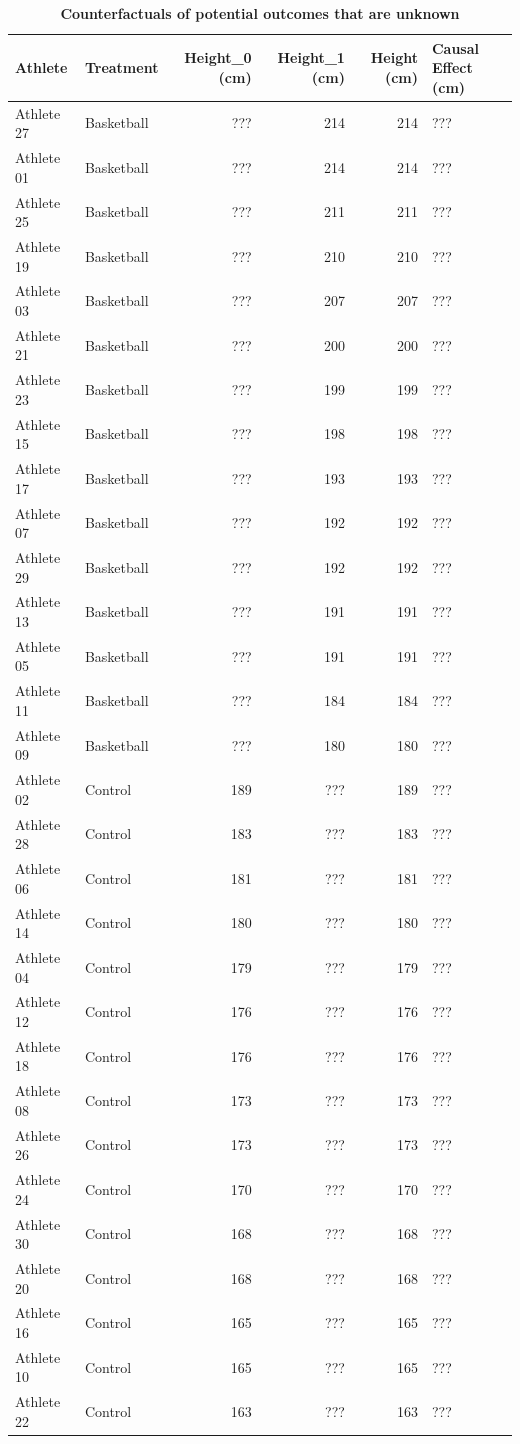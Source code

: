 \documentclass[
]{book}
\begin{document}
\begin{table}

\caption{\label{tab:basketball-counterfactuals}\textbf{Counterfactuals of potential outcomes that are unknown}}
\centering
\begin{tabular}[t]{llrrrl}
\toprule
Athlete & Treatment & Height\_0 (cm) & Height\_1 (cm) & Height (cm) & Causal Effect (cm)\\
\midrule
Athlete 27 & Basketball & ??? & 214 & 214 & ???\\
Athlete 01 & Basketball & ??? & 214 & 214 & ???\\
Athlete 25 & Basketball & ??? & 211 & 211 & ???\\
Athlete 19 & Basketball & ??? & 210 & 210 & ???\\
Athlete 03 & Basketball & ??? & 207 & 207 & ???\\
\addlinespace
Athlete 21 & Basketball & ??? & 200 & 200 & ???\\
Athlete 23 & Basketball & ??? & 199 & 199 & ???\\
Athlete 15 & Basketball & ??? & 198 & 198 & ???\\
Athlete 17 & Basketball & ??? & 193 & 193 & ???\\
Athlete 07 & Basketball & ??? & 192 & 192 & ???\\
\addlinespace
Athlete 29 & Basketball & ??? & 192 & 192 & ???\\
Athlete 13 & Basketball & ??? & 191 & 191 & ???\\
Athlete 05 & Basketball & ??? & 191 & 191 & ???\\
Athlete 11 & Basketball & ??? & 184 & 184 & ???\\
Athlete 09 & Basketball & ??? & 180 & 180 & ???\\
\addlinespace
Athlete 02 & Control & 189 & ??? & 189 & ???\\
Athlete 28 & Control & 183 & ??? & 183 & ???\\
Athlete 06 & Control & 181 & ??? & 181 & ???\\
Athlete 14 & Control & 180 & ??? & 180 & ???\\
Athlete 04 & Control & 179 & ??? & 179 & ???\\
\addlinespace
Athlete 12 & Control & 176 & ??? & 176 & ???\\
Athlete 18 & Control & 176 & ??? & 176 & ???\\
Athlete 08 & Control & 173 & ??? & 173 & ???\\
Athlete 26 & Control & 173 & ??? & 173 & ???\\
Athlete 24 & Control & 170 & ??? & 170 & ???\\
\addlinespace
Athlete 30 & Control & 168 & ??? & 168 & ???\\
Athlete 20 & Control & 168 & ??? & 168 & ???\\
Athlete 16 & Control & 165 & ??? & 165 & ???\\
Athlete 10 & Control & 165 & ??? & 165 & ???\\
Athlete 22 & Control & 163 & ??? & 163 & ???\\
\bottomrule
\end{tabular}
\end{table}
\end{document}
